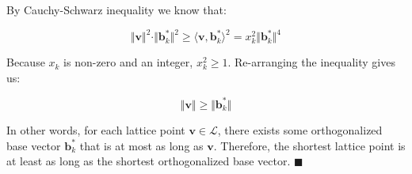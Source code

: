 \documentclass{article}
\newcommand{\norm}[1]{\Vert {#1} \Vert}
\begin{document}
By Cauchy-Schwarz inequality we know that:

$$
\norm{\mathbf{v}}^2 \cdot \norm{\mathbf{b}_k^\ast}^2 
\geq \langle \mathbf{v}, \mathbf{b}_k^\ast \rangle^2 
= x_k^2 \norm{\mathbf{b}_k^\ast}^4
$$

Because $x_k$ is non-zero and an integer, $x_k^2 \geq 1$. Re-arranging the inequality gives us:

$$
\norm{\mathbf{v}} \geq \norm{\mathbf{b}_k^\ast}
$$

In other words, for each lattice point $\mathbf{v} \in \mathcal{L}$, there exists some orthogonalized base vector $\mathbf{b}_k^\ast$ that is at most as long as $\mathbf{v}$. Therefore, the shortest lattice point is at least as long as the shortest orthogonalized base vector. $\blacksquare$
\end{document}
